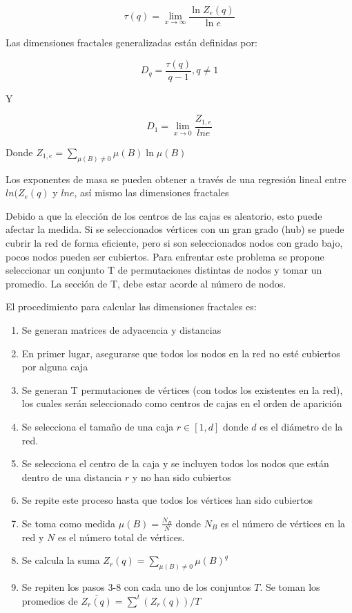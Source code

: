 \begin{equation}
    \tau(q) = \lim_{x \to \infty} \frac{\ln Z_e(q)}{\ln e}
\end{equation}

Las dimensiones fractales generalizadas están definidas por:

\begin{equation}
    D_q = \frac{\tau(q)}{q-1}, q \neq 1
\end{equation}

Y

\begin{equation}
    D_1 = \lim_{x \to 0} \frac{Z_{1,e}}{ln e}
\end{equation}

Donde $Z_{1,e} = \sum \limits_{\mu(B) \neq 0} \mu(B) \ln \mu(B)$

Los exponentes de masa se pueden obtener a través de una regresión lineal entre $ln(Z_e(q)$ y $ln e$, así mismo las dimensiones fractales 

Debido a que la elección de los centros de las cajas es aleatorio, esto puede afectar la medida. Si se seleccionados vértices con un gran grado (hub) se puede cubrir la red de forma eficiente, pero si son seleccionados nodos con grado bajo, pocos nodos pueden ser cubiertos. Para enfrentar este problema se propone seleccionar un conjunto T de permutaciones distintas de nodos y tomar un promedio. La sección de T, debe estar acorde al número de nodos.

El procedimiento para calcular las dimensiones fractales es:

\begin{enumerate}
    \item Se generan matrices de adyacencia y distancias
    \item En primer lugar, asegurarse que todos los nodos en la red no esté cubiertos por alguna caja
     \item Se generan T permutaciones de vértices (con todos los existentes en la red), los cuales serán seleccionado como centros de cajas en el orden de aparición
     \item Se selecciona el tamaño de una caja $r\in[1,d]$  donde $d$ es el diámetro de la red.
     \item Se selecciona el centro de la caja y se incluyen todos los nodos que están dentro de una distancia $r$ y no han sido cubiertos
     \item Se repite este proceso hasta que todos los vértices han sido cubiertos
     \item Se toma como medida $\mu(B)=\frac{N_B}{N}$ donde $N_B$ es el número de vértices en la red y $N$ es el número total de vértices.
     \item Se calcula la suma $ Z_r(q) =  \sum \limits_{\mu(B) \neq 0} \mu(B)^q$
     \item Se repiten los pasos 3-8 con cada uno de los conjuntos $T$. Se toman los promedios de $\overline{Z_r(q)} = \sum^t (Z_r(q))/T$  
\end{enumerate}

